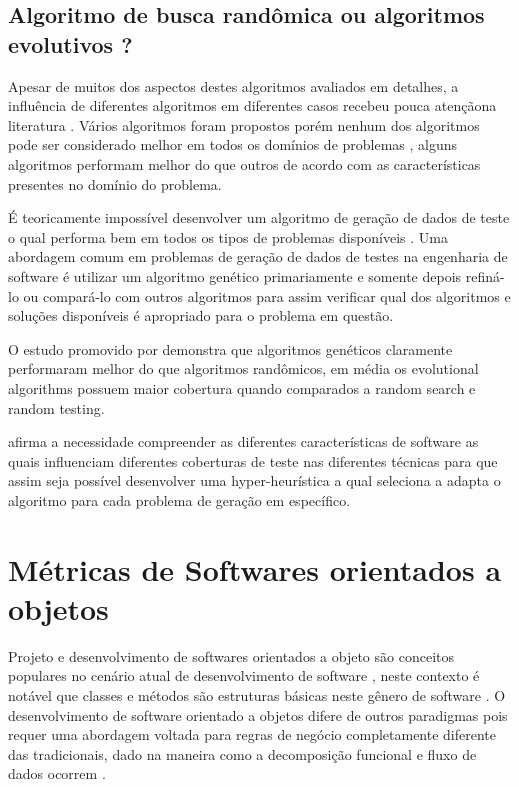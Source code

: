 \documentclass[
	12pt,				%
	oneside,			%
	a4paper,			%
	english,			%
	brazil				%
	]{abntex2ppgsi}
\begin{document}
\section{Algoritmo de busca randômica ou algoritmos evolutivos ?}
Apesar de muitos dos aspectos destes algoritmos avaliados em detalhes, a influência de diferentes algoritmos em diferentes casos recebeu pouca atençãona literatura \cite{Campos2017}. Vários algoritmos foram propostos porém nenhum dos algoritmos pode ser considerado melhor em todos os domínios de problemas , alguns algoritmos performam melhor do que outros de acordo com as características presentes no domínio do problema. \cite{Campos2017}


É teoricamente impossível desenvolver um algoritmo de geração de dados de teste o qual performa bem em todos os tipos de problemas disponíveis \cite{Campos2017}. Uma abordagem comum em problemas de geração de dados de testes na engenharia de software é utilizar um algoritmo genético primariamente e somente depois refiná-lo ou compará-lo com outros algoritmos para assim verificar qual dos algoritmos e soluções disponíveis  é apropriado para o problema em questão. \cite{Campos2017}

O estudo promovido por \cite{Campos2017} demonstra que algoritmos genéticos claramente performaram melhor do que algoritmos randômicos, em média os evolutional algorithms possuem maior cobertura quando comparados a random search e random testing. \cite{Campos2017}

\cite{Campos2017} afirma a necessidade compreender as diferentes características de software as quais influenciam diferentes coberturas de teste nas diferentes técnicas para que assim seja possível desenvolver uma hyper-heurística a qual seleciona a adapta o algoritmo para cada problema de geração em específico.

\chapter{Métricas de Softwares orientados a objetos}

Projeto e desenvolvimento de softwares orientados a objeto são conceitos populares no cenário atual de desenvolvimento de software \cite{srivastava2013}, neste contexto é notável que classes e métodos são estruturas básicas neste gênero de software \cite{kan95}. O desenvolvimento de software orientado a objetos difere de outros paradigmas pois requer uma abordagem voltada para regras de negócio completamente diferente das tradicionais, dado na maneira como a decomposição funcional e fluxo de dados ocorrem  \cite{srivastava2013}.
\end{document}
